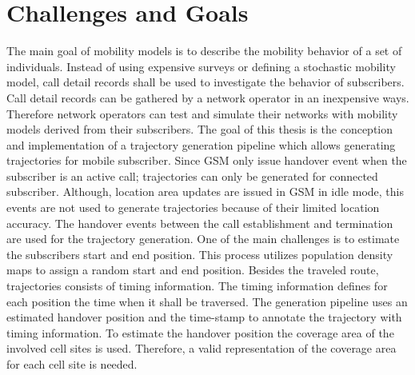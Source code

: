 \documentclass[master,english]{hgbthesis}
\begin{document}
\section{Challenges and Goals}
The main goal of mobility models is to describe the mobility behavior of a set of individuals. Instead of using expensive surveys or defining a stochastic mobility model, call detail records shall be used to investigate the behavior of subscribers. Call detail records can be gathered by a network operator in an inexpensive ways. Therefore network operators can test and simulate their networks with mobility models derived from their subscribers.
The goal of this thesis is the conception and implementation of a trajectory generation pipeline which allows generating trajectories for mobile subscriber. Since GSM only issue handover event when the subscriber is an active call; trajectories can only be generated for connected subscriber. Although, location area updates are issued in GSM in idle mode, this events are not used to generate trajectories because of their limited location accuracy. The handover events between the call establishment and termination are used for the trajectory generation. One of the main challenges is to estimate the subscribers start and end position. This process utilizes population density maps to assign a random start and end position.
Besides the traveled route, trajectories consists of timing information. The timing information defines for each position the time when it shall be traversed. The generation pipeline uses an estimated handover position and the time-stamp to annotate the trajectory with timing information. To estimate the handover position the coverage area of the involved cell sites is used. Therefore, a valid representation of the coverage area for each cell site is needed.
\end{document}
